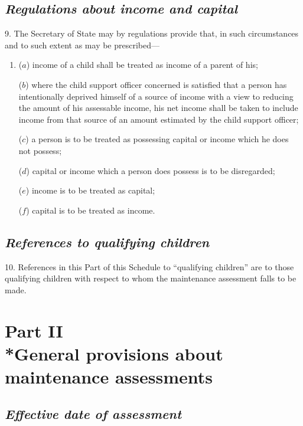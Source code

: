 \documentclass[12pt,a4paper]{article}
\begin{document}
\subsection*{\itshape Regulations about income and capital}

9. The Secretary of State may by regulations provide that, in such circumstances and to such extent as may be prescribed—
\begin{enumerate}\item[]
($a$) income of a child shall be treated as income of a parent of his;

($b$) where the child support officer concerned is satisfied that a person has intentionally deprived himself of a source of income with a view to reducing the amount of his assessable income, his net income shall be taken to include income from that source of an amount estimated by the child support officer;

($c$) a person is to be treated as possessing capital or income which he does not possess;

($d$) capital or income which a person does possess is to be disregarded;

($e$) income is to be treated as capital;

($f$) capital is to be treated as income.
\end{enumerate}

\subsection*{\itshape References to qualifying children}

10. References in this Part of this Schedule to “qualifying children” are to those qualifying children with respect to whom the maintenance assessment falls to be made.


\section[Part II --- General provisions about maintenance assessments]{Part II\\*General provisions about maintenance assessments}

\renewcommand\parthead{--- Schedule 1 Part II}

\subsection*{\itshape Effective date of assessment}
\end{document}
